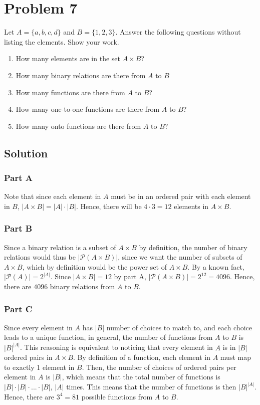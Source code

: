 \documentclass[table]{article}
\begin{document}
\section{Problem 7}
Let $A = \{a, b, c, d\}$ and $B = \{1, 2, 3\}$. Answer the following questions without listing the elements. Show your work.
\begin{enumerate}[nosep,label=\alph*)]
\item How many elements are in the set $A \times B$?
\item How many binary relations are there from $A$ to $B$
\item How many functions are there from $A$ to $B$?
\item How many one-to-one functions are there from $A$ to $B$?
\item How many onto functions are there from $A$ to $B$?
\end{enumerate}
\subsection{Solution}
\subsubsection{Part A}
Note that since each element in $A$ must be in an ordered pair with each element in $B$, $|A \times B| = |A| \cdot |B|$. Hence, there will be $4 \cdot 3 = 12$ elements in $A \times B$.
\subsubsection{Part B}
Since a binary relation is a subset of $A \times B$ by definition, the number of binary relations would thus be $|\mathcal{P}(A \times B)|$, since we want the number of subsets of $A \times B$, which by definition would be the power set of $A \times B$. By a known fact, $|\mathcal{P}(A)|=2^{|A|}$. Since $|A \times B| = 12$ by part A, $|\mathcal{P}(A \times B)|=2^{12}=4096$. Hence, there are $4096$ binary relations from $A$ to $B$.
\subsubsection{Part C}
Since every element in $A$ has $|B|$ number of choices to match to, and each choice leads to a unique function, in general, the number of functions from $A$ to $B$ is $|B|^{|A|}$. This reasoning is equivalent to noticing that every element in $A$ is in $|B|$ ordered pairs in $A \times B$. By definition of a function, each element in $A$ must map to exactly 1 element in $B$. Then, the number of choices of ordered pairs per element in $A$ is $|B|$, which means that the total number of functions is $|B| \cdot |B| \cdot ...\cdot |B|$, $|A|$ times. This means that the number of functions is then $|B|^{|A|}$. Hence, there are $3^4=81$ possible functions from $A$ to $B$.
\end{document}
